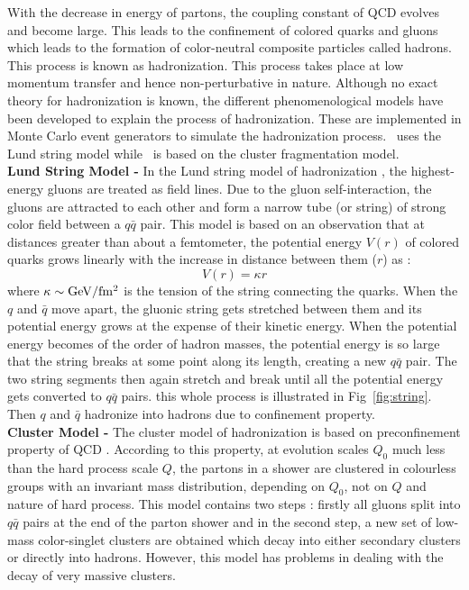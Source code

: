 With the decrease in energy of partons, the coupling constant of QCD \alps evolves and become large. This leads to the confinement of colored quarks and gluons which leads to the formation of color-neutral composite particles called hadrons. This process is known as hadronization. This process takes place at low momentum transfer and hence non-perturbative in nature. Although no exact theory for hadronization is known, the different phenomenological models have been developed to explain the process of hadronization. These are implemented in Monte Carlo event generators to simulate the hadronization process. \PYTHIA~uses the Lund string model while \HERWIG~is based on the cluster fragmentation model. \\\newline
{\bf Lund String Model -} In the Lund string model of hadronization \cite{Andersson:1998tv}, the highest-energy gluons are treated as field lines. Due to the gluon self-interaction, the gluons are attracted to each other and form a narrow tube (or string) of strong color field between a $q\bar{q}$ pair. This model is based on an observation that at distances greater than about a femtometer, the potential energy $V(r)$ of colored quarks grows linearly with the increase in distance between them ($r$) as :
\begin{equation}
V(r) = \kappa r
\end{equation}
where $\kappa \sim {\rm GeV/fm^2}$ is the tension of the string connecting the quarks. When the $q$ and $\bar{q}$ move apart, the gluonic string gets stretched between them and its potential energy grows at the expense of their kinetic energy. When the potential energy becomes of the order of hadron masses, the potential energy is so large that the string breaks at some point along its length, creating a new $q\bar{q}$ pair. The two string segments then again stretch and break until all the potential energy gets converted to $q\bar{q}$ pairs. this whole process is illustrated in Fig~\ref{fig:string}. Then $q$ and $\bar{q}$ hadronize into hadrons due to confinement property. \\ \newline
{\bf Cluster Model -} The cluster model of hadronization \cite{Marchesini:1987cf,Webber:1983if} is based on preconfinement property of QCD \cite{Amati:1979fg}. According to this property, at evolution scales $Q_0$ much less than the hard process scale $Q$, the partons in a shower are clustered in colourless groups with an invariant mass distribution, depending on $Q_0$, not on $Q$ and nature of hard process. This model contains two steps : firstly all gluons split into $q\bar{q}$ pairs at the end of the parton shower and in the second step, a new set of low-mass color-singlet clusters are obtained which decay into either secondary clusters or directly into hadrons. However, this model has problems in dealing with the decay of very massive clusters.

